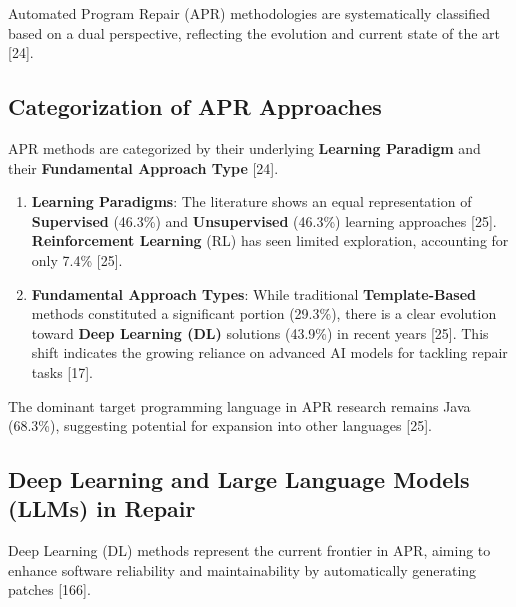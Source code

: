 Automated Program Repair (APR) methodologies are systematically classified based on a dual perspective, reflecting the evolution and current state of the art [24].

\subsection{Categorization of APR Approaches}
APR methods are categorized by their underlying \textbf{Learning Paradigm} and their \textbf{Fundamental Approach Type} [24].

\begin{enumerate}
    \item \textbf{Learning Paradigms}: The literature shows an equal representation of \textbf{Supervised} (46.3\%) and \textbf{Unsupervised} (46.3\%) learning approaches [25]. \textbf{Reinforcement Learning} (RL) has seen limited exploration, accounting for only 7.4\% [25].
    \item \textbf{Fundamental Approach Types}: While traditional \textbf{Template-Based} methods constituted a significant portion (29.3\%), there is a clear evolution toward \textbf{Deep Learning (DL)} solutions (43.9\%) in recent years [25]. This shift indicates the growing reliance on advanced AI models for tackling repair tasks [17].
\end{enumerate}
The dominant target programming language in APR research remains Java (68.3\%), suggesting potential for expansion into other languages [25].

\subsection{Deep Learning and Large Language Models (LLMs) in Repair}

Deep Learning (DL) methods represent the current frontier in APR, aiming to enhance software reliability and maintainability by automatically generating patches [166].

